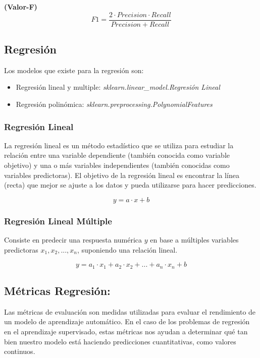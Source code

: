 \documentclass[../main.tex]{subfiles}
\begin{document}
        \begin{definition} \textbf{(Valor-F)}
            \begin{equation}
                F1 = \frac{2 \cdot Precision \cdot Recall}{Precision + Recall}
            \end{equation}
        \end{definition}
    
    \subsection{Regresión}
        Los modelos que existe para la regresión son:
        \begin{itemize}
            \item Regresión lineal y multiple: \textit{sklearn.linear\_model.Regresión Lineal}
            \item Regresión polinómica: \textit{sklearn.preprocessing.PolynomialFeatures}
        \end{itemize}

        \subsubsection{Regresión Lineal}
            La regresión lineal es un método estadístico que se utiliza para estudiar la relación entre una variable dependiente (también conocida como variable objetivo) y una o más variables independientes (también conocidas como variables predictoras). El objetivo de la regresión lineal es encontrar la línea (recta) que mejor se ajuste a los datos y pueda utilizarse para hacer predicciones.
        
           \begin{equation}
                y = a \cdot x + b
           \end{equation}
            
        \subsubsection{Regresión Lineal Múltiple}
            Consiste en predecir una respuesta numérica $y$ en base a múltiples variables predictoras $x_1, x_2, ..., x_n $, suponiendo una relación lineal. 
		
		\begin{equation}
			y = a_1 \cdot x_1 + a_2 \cdot x_2 + ... + a_n \cdot x_n + b
		\end{equation}
		
	\subsection{Métricas Regresión:}
        Las métricas de evaluación son medidas utilizadas para evaluar el rendimiento de un modelo de aprendizaje automático. En el caso de los problemas de regresión en el aprendizaje supervisado, estas métricas nos ayudan a determinar qué tan bien nuestro modelo está haciendo predicciones cuantitativas, como valores continuos.\\
    
\end{document}
